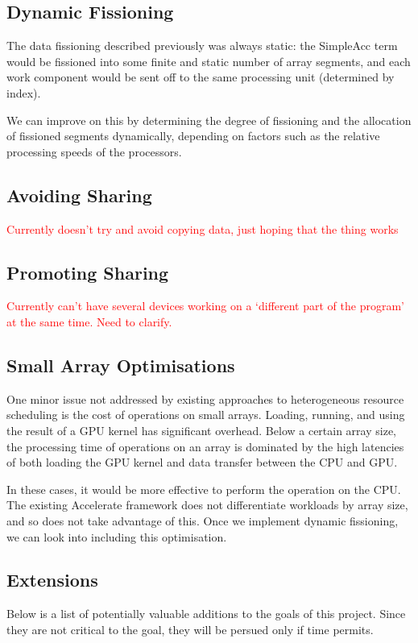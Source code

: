 \documentclass[a4paper,12pt]{article}
\newcommand{\red}[1]{\textcolor{red}{#1}}
\begin{document}
\subsection{Dynamic Fissioning}
The data fissioning described previously was always static: the SimpleAcc term would be fissioned into some finite and static number of array segments, and each work component would be sent off to the same processing unit (determined by index).

We can improve on this by determining the degree of fissioning and the allocation of fissioned segments dynamically, depending on factors such as the relative processing speeds of the processors.

\subsection{Avoiding Sharing}
\red{Currently doesn't try and avoid copying data, just hoping that the thing works}

\subsection{Promoting Sharing}
\red{Currently can't have several devices working on a `different part of the program' at the same time. Need to clarify.}

\subsection{Small Array Optimisations}
One minor issue not addressed by existing approaches to heterogeneous resource scheduling is the cost of operations on small arrays.
Loading, running, and using the result of a GPU kernel has significant overhead.
Below a certain array size, the processing time of operations on an array is dominated by the high latencies of both loading the GPU kernel and data transfer between the CPU and GPU.

In these cases, it would be more effective to perform the operation on the CPU.
The existing Accelerate framework does not differentiate workloads by array size, and so does not take advantage of this.
Once we implement dynamic fissioning, we can look into including this optimisation.

\subsection{Extensions}
Below is a list of potentially valuable additions to the goals of this project.
Since they are not critical to the goal, they will be persued only if time permits.
\end{document}
